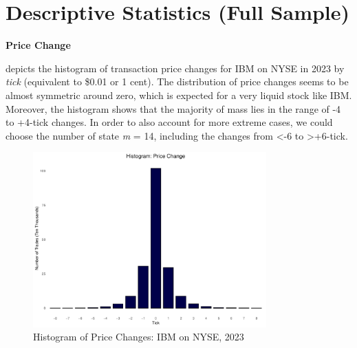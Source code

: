 \section{Descriptive Statistics (Full Sample)}

{\noindent\bfseries Price Change }

 depicts the histogram of transaction price changes for IBM on NYSE in 2023 by \textit{tick }(equivalent to \$0.01 or 1 cent). The distribution of price changes seems to be almost symmetric around zero, which is expected for a very liquid stock like IBM. Moreover, the histogram shows that the majority of mass lies in the range of -4 to +4-tick changes. In order to also account for more extreme cases, we could choose the number of state \textit{m} = 14, including the changes from <-6 to >+6-tick. 




\begin{figure}[htbp]
    \centering
    \includegraphics[width=0.8\textwidth]{figures/descriptive stat/price_change_IBM_N_2023.pdf}
    \caption{Histogram of Price Changes: IBM on NYSE, 2023}
    \label{fig:price-change-2023}
\end{figure}







